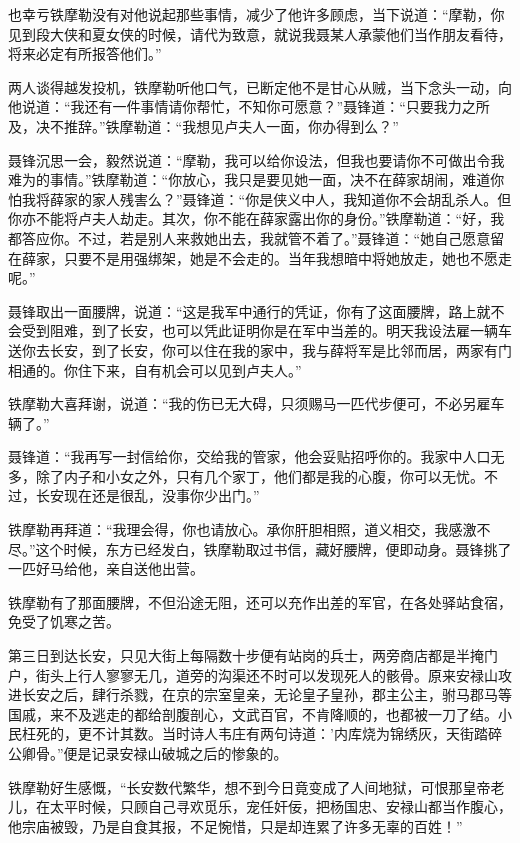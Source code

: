 \documentclass[12pt,oneside]{book}
\begin{document}
也幸亏铁摩勒没有对他说起那些事情，减少了他许多顾虑，当下说道：``摩勒，你见到段大侠和夏女侠的时候，请代为致意，就说我聂某人承蒙他们当作朋友看待，将来必定有所报答他们。''

两人谈得越发投机，铁摩勒听他口气，已断定他不是甘心从贼，当下念头一动，向他说道：``我还有一件事情请你帮忙，不知你可愿意？''聂锋道：``只要我力之所及，决不推辞。''铁摩勒道：``我想见卢夫人一面，你办得到么？''

聂锋沉思一会，毅然说道：``摩勒，我可以给你设法，但我也要请你不可做出令我难为的事情。''铁摩勒道：``你放心，我只是要见她一面，决不在薛家胡闹，难道你怕我将薛家的家人残害么？''聂锋道：``你是侠义中人，我知道你不会胡乱杀人。但你亦不能将卢夫人劫走。其次，你不能在薛家露出你的身份。''铁摩勒道：``好，我都答应你。不过，若是别人来救她出去，我就管不着了。''聂锋道：``她自己愿意留在薛家，只要不是用强绑架，她是不会走的。当年我想暗中将她放走，她也不愿走呢。''

聂锋取出一面腰牌，说道：``这是我军中通行的凭证，你有了这面腰牌，路上就不会受到阻难，到了长安，也可以凭此证明你是在军中当差的。明天我设法雇一辆车送你去长安，到了长安，你可以住在我的家中，我与薛将军是比邻而居，两家有门相通的。你住下来，自有机会可以见到卢夫人。''

铁摩勒大喜拜谢，说道：``我的伤已无大碍，只须赐马一匹代步便可，不必另雇车辆了。''

聂锋道：``我再写一封信给你，交给我的管家，他会妥贴招呼你的。我家中人口无多，除了内子和小女之外，只有几个家丁，他们都是我的心腹，你可以无忧。不过，长安现在还是很乱，没事你少出门。''

铁摩勒再拜道：``我理会得，你也请放心。承你肝胆相照，道义相交，我感激不尽。''这个时候，东方已经发白，铁摩勒取过书信，藏好腰牌，便即动身。聂锋挑了一匹好马给他，亲自送他出营。

铁摩勒有了那面腰牌，不但沿途无阻，还可以充作出差的军官，在各处驿站食宿，免受了饥寒之苦。

第三日到达长安，只见大街上每隔数十步便有站岗的兵士，两旁商店都是半掩门户，街头上行人寥寥无几，道旁的沟渠还不时可以发现死人的骸骨。原来安禄山攻进长安之后，肆行杀戮，在京的宗室皇亲，无论皇子皇孙，郡主公主，驸马郡马等国戚，来不及逃走的都给剖腹剖心，文武百官，不肯降顺的，也都被一刀了结。小民枉死的，更不计其数。当时诗人韦庄有两句诗道：'内库烧为锦绣灰，天街踏碎公卿骨。''便是记录安禄山破城之后的惨象的。

铁摩勒好生感慨，``长安数代繁华，想不到今日竟变成了人间地狱，可恨那皇帝老儿，在太平时候，只顾自己寻欢觅乐，宠任奸佞，把杨国忠、安禄山都当作腹心，他宗庙被毁，乃是自食其报，不足惋惜，只是却连累了许多无辜的百姓！''
\end{document}
